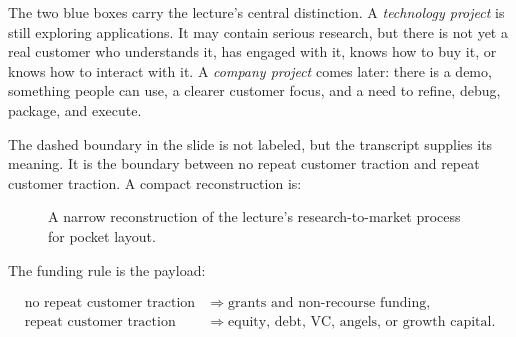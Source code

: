 The two blue boxes carry the lecture's central distinction. A \emph{technology project} is still exploring applications. It may contain serious research, but there is not yet a real customer who understands it, has engaged with it, knows how to buy it, or knows how to interact with it. A \emph{company project} comes later: there is a demo, something people can use, a clearer customer focus, and a need to refine, debug, package, and execute.

The dashed boundary in the slide is not labeled, but the transcript supplies its meaning. It is the boundary between no repeat customer traction and repeat customer traction. A compact reconstruction is:

\begin{figure}
\centering
{}
\caption{A narrow reconstruction of the lecture's research-to-market process for pocket layout.}
\end{figure}

The funding rule is the payload:

\begin{align}
\text{no repeat customer traction}
&\Rightarrow
\text{grants and non-recourse funding},\\
\text{repeat customer traction}
&\Rightarrow
\text{equity, debt, VC, angels, or growth capital}.
\end{align}

